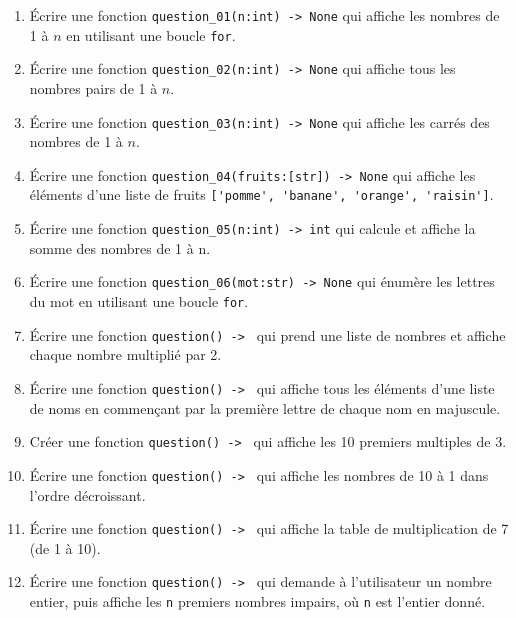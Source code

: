 
\begin{enumerate}

    \item Écrire une fonction \lstinline{question_01(n:int) -> None} qui affiche les nombres de 1 à $n$ en utilisant une boucle \lstinline{for}.

    \item Écrire une fonction \lstinline{question_02(n:int) -> None} qui affiche tous les nombres pairs de 1 à $n$.

    \item Écrire une fonction \lstinline{question_03(n:int) -> None} qui affiche les carrés des nombres de 1 à $n$.

    \item Écrire une fonction \lstinline{question_04(fruits:[str]) -> None} qui affiche les éléments d'une liste de fruits \lstinline{['pomme', 'banane', 'orange', 'raisin']}.

    \item Écrire une fonction \lstinline{question_05(n:int) -> int} qui calcule et affiche la somme des nombres de 1 à n.

    \item Écrire une fonction \lstinline{question_06(mot:str) -> None} qui énumère les lettres du mot en utilisant une boucle \lstinline{for}.

    \item Écrire une fonction \lstinline{question() -> } qui prend une liste de nombres et affiche chaque nombre multiplié par 2.

    \item Écrire une fonction \lstinline{question() -> } qui affiche tous les éléments d'une liste de noms en commençant par la première lettre de chaque nom en majuscule.

    \item Créer une fonction \lstinline{question() -> } qui affiche les 10 premiers multiples de 3.

    \item Écrire une fonction \lstinline{question() -> } qui affiche les nombres de 10 à 1 dans l'ordre décroissant.

    \item Écrire une fonction \lstinline{question() -> } qui affiche la table de multiplication de 7 (de 1 à 10).

    \item Écrire une fonction \lstinline{question() -> } qui demande à l'utilisateur un nombre entier, puis affiche les \lstinline{n} premiers nombres impairs, où \lstinline{n} est l'entier donné.


\end{enumerate}
